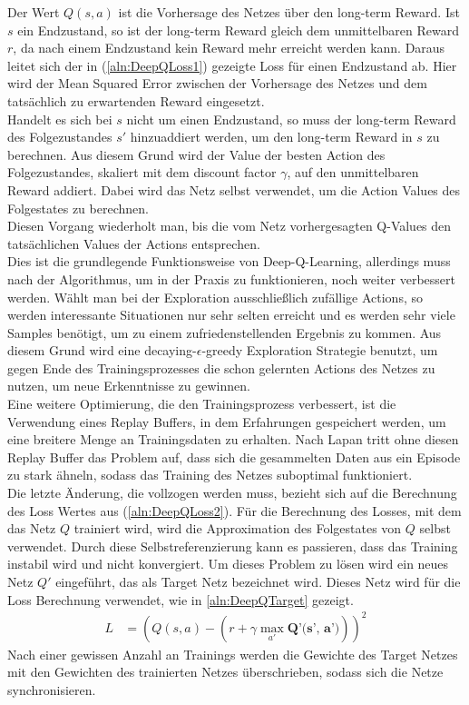 \documentclass[11pt]{scrartcl}
\begin{document}
\noindent
Der Wert $Q(s, a)$ ist die Vorhersage des Netzes über den long-term Reward. Ist $s$ ein
Endzustand, so ist der long-term Reward gleich dem unmittelbaren Reward $r$, da nach einem
Endzustand kein Reward mehr erreicht werden kann. Daraus leitet sich der in
(\ref{aln:DeepQLoss1}) gezeigte Loss für einen Endzustand ab. Hier wird der Mean Squared
Error zwischen der Vorhersage des Netzes und dem tatsächlich zu erwartenden Reward
eingesetzt.\\
Handelt es sich bei $s$ nicht um einen Endzustand, so muss der long-term Reward des
Folgezustandes $s'$ hinzuaddiert werden, um den long-term Reward in $s$ zu berechnen. Aus
diesem Grund wird der Value der besten Action des Folgezustandes, skaliert mit dem
discount factor $\gamma$, auf den unmittelbaren Reward addiert. Dabei wird das Netz selbst
verwendet, um die Action Values des Folgestates zu berechnen.\\
Diesen Vorgang wiederholt man, bis die vom Netz vorhergesagten Q-Values den
tat\-säch\-lich\-en Values der Actions entsprechen.\\
Dies ist die grundlegende Funktionsweise von Deep-Q-Learning, allerdings muss nach
\cite[~S.202]{L2018} der Algorithmus, um in der Praxis zu funktionieren, noch weiter
verbessert werden. Wählt man bei der Exploration ausschließlich zufällige Actions, so
werden interessante Situationen nur sehr selten erreicht und es werden sehr viele Samples
benötigt, um zu einem zufriedenstellenden Ergebnis zu kommen. Aus diesem Grund wird eine
decaying-$\epsilon$-greedy Exploration Strategie benutzt, um gegen Ende des
Trainingsprozesses die schon gelernten Actions des Netzes zu nutzen, um neue Erkenntnisse
zu gewinnen.\\
Eine weitere Optimierung, die den Trainingsprozess verbessert, ist die Verwendung eines
Replay Buffers, in dem Erfahrungen gespeichert werden, um eine breitere Menge an
Trainingsdaten zu erhalten. Nach Lapan \cite{L2018} tritt ohne diesen Replay Buffer das
Problem auf, dass sich die gesammelten Daten aus ein Episode zu stark ähneln, sodass das
Training des Netzes suboptimal funktioniert.\\
Die letzte Änderung, die vollzogen werden muss, bezieht sich auf die Berechnung des Loss
Wertes aus (\ref{aln:DeepQLoss2}). Für die Berechnung des Losses, mit dem das Netz $Q$
trainiert wird, wird die Approximation des Folgestates von $Q$ selbst verwendet. Durch
diese Selbstreferenzierung kann es passieren, dass das Training instabil wird und nicht
konvergiert. Um dieses Problem zu lösen wird ein neues Netz $Q'$ eingeführt, das als
Target Netz bezeichnet wird. Dieses Netz wird für die Loss Berechnung verwendet, wie in
\ref{aln:DeepQTarget} gezeigt.
\begin{align}
  L & = \left(Q(s, a) - \left(r + \gamma \max_{a'} \textbf{Q'(s', a')}\right)\right)^2
  \label{aln:DeepQTarget}
\end{align}
\noindent
Nach einer gewissen Anzahl an Trainings werden die Gewichte des Target Netzes mit den
Gewichten des trainierten Netzes überschrieben, sodass sich die Netze synchronisieren.
\end{document}
